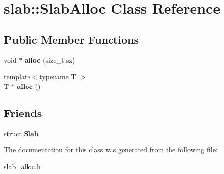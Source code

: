\hypertarget{classslab_1_1SlabAlloc}{\section{slab\-:\-:Slab\-Alloc Class Reference}
\label{classslab_1_1SlabAlloc}
}
\subsection*{Public Member Functions}
\begin{DoxyCompactItemize}
\item 
\hypertarget{classslab_1_1SlabAlloc_a4d40d4973ac3a7d3fa21ca07498a1185}{void $\ast$ {\bfseries alloc} (size\-\_\-t sz)}\label{classslab_1_1SlabAlloc_a4d40d4973ac3a7d3fa21ca07498a1185}

\item 
\hypertarget{classslab_1_1SlabAlloc_a444c0a89148ca2efe19032f9151d25bb}{{\footnotesize template$<$typename T $>$ }\\T $\ast$ {\bfseries alloc} ()}\label{classslab_1_1SlabAlloc_a444c0a89148ca2efe19032f9151d25bb}

\end{DoxyCompactItemize}
\subsection*{Friends}
\begin{DoxyCompactItemize}
\item 
\hypertarget{classslab_1_1SlabAlloc_ade37823df2adc784f03f3a1508ee22b4}{struct {\bfseries Slab}}\label{classslab_1_1SlabAlloc_ade37823df2adc784f03f3a1508ee22b4}

\end{DoxyCompactItemize}


The documentation for this class was generated from the following file\-:\begin{DoxyCompactItemize}
\item 
slab\-\_\-alloc.\-h\end{DoxyCompactItemize}
